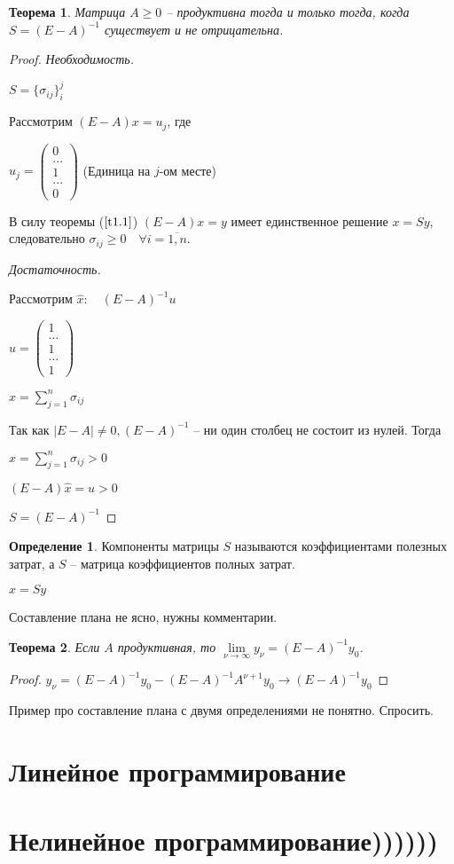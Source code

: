 \documentclass[12pt,a4paper,titlepage,oneside]{book}
\theoremstyle{definition}
\newtheorem{definition}{Определение}[chapter]
\theoremstyle{plain}
\newtheorem{theorem}{Теорема}[chapter]
\theoremstyle{remark}
\theoremstyle{remark}
\theoremstyle{plain}
\theoremstyle{plain}
\begin{document}
\begin{theorem}\label{t1.2}
Матрица $A \geq 0$ -- продуктивна тогда и только тогда, когда $S = (E-A)^{-1}$ существует и не отрицательна.
\end{theorem}

\begin{proof}

\textit{Необходимость.}

$S = \{ \sigma_{ij} \}_{i}^{j}$

Рассмотрим $(E-A)x = u_j$, где

$u_j = \left(\begin{array}{crl}
0\\ ... \\1\\...\\ 0
\end{array}\right)$ (Единица на $j$-ом месте)

В силу теоремы ($\ref{t1.1}$) $(E-A)x=y$ имеет единственное решение $x=Sy$, следовательно $\sigma_{ij} \geq 0 \quad \forall i = \overline{1,n}$.

\textit{Достаточность.}

Рассмотрим $\hat{x}: \quad (E-A)^{-1}u$

$u = \left(\begin{array}{crl}
1\\ ... \\1\\...\\ 1
\end{array}\right)$

$\hat{x} = \sum\limits_{j=1}^{n} \sigma_{ij}$

Так как $|E-A| \neq 0, (E-A)^{-1}$ -- ни один столбец не состоит из нулей. Тогда 

$\hat{x} = \sum\limits_{j=1}^{n} \sigma_{ij} > 0$

$(E-A)\hat{x}=u>0$

$S=(E-A)^{-1}$
\end{proof}

\begin{definition}
Компоненты матрицы $S$ называются коэффициентами полезных затрат, а $S$ -- матрица коэффициентов полных затрат.

$x = Sy$

\end{definition}


Составление плана не ясно, нужны комментарии.

\begin{theorem}
Если $A$ продуктивная, то $\lim\limits_{\nu \to \infty} y_{\nu} = (E-A)^{-1}y_0$.
\end{theorem}

\begin{proof}
$y_{\nu} = (E-A)^{-1}y_0 - (E-A)^{-1}A^{\nu+1}y_0 \to (E-A)^{-1}y_0$
\end{proof}



Пример про составление плана с двумя определениями не понятно. Спросить.
\chapter{Линейное программирование}



\chapter{Нелинейное программирование))))))}
\end{document}
